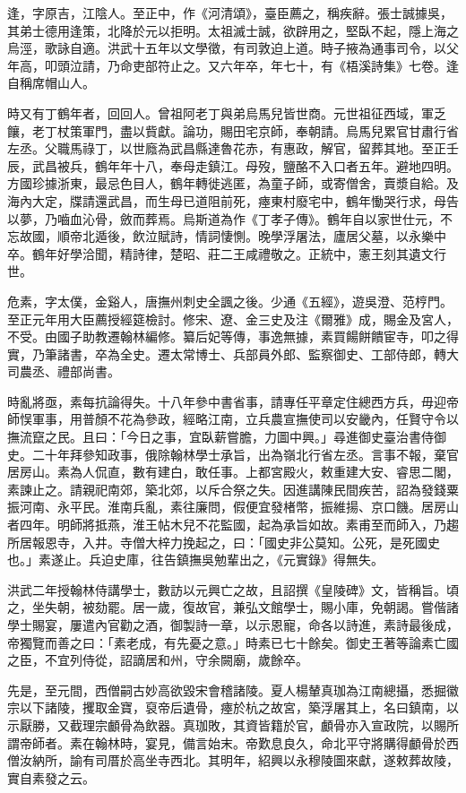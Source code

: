 \begin{pinyinscope}
逢，字原吉，江陰人。至正中，作《河清頌》，臺臣薦之，稱疾辭。張士誠據吳，其弟士德用逢策，北降於元以拒明。太祖滅士誠，欲辟用之，堅臥不起，隱上海之烏涇，歌詠自適。洪武十五年以文學徵，有司敦迫上道。時子掖為通事司令，以父年高，叩頭泣請，乃命吏部符止之。又六年卒，年七十，有《梧溪詩集》七卷。逢自稱席帽山人。

時又有丁鶴年者，回回人。曾祖阿老丁與弟烏馬兒皆世商。元世祖征西域，軍乏饟，老丁杖策軍門，盡以貲獻。論功，賜田宅京師，奉朝請。烏馬兒累官甘肅行省左丞。父職馬祿丁，以世廕為武昌縣達魯花赤，有惠政，解官，留葬其地。至正壬辰，武昌被兵，鶴年年十八，奉母走鎮江。母歿，鹽酪不入口者五年。避地四明。方國珍據浙東，最忌色目人，鶴年轉徙逃匿，為童子師，或寄僧舍，賣漿自給。及海內大定，牒請還武昌，而生母已道阻前死，瘞東村廢宅中，鶴年慟哭行求，母告以夢，乃嚙血沁骨，斂而葬焉。烏斯道為作《丁孝子傳》。鶴年自以家世仕元，不忘故國，順帝北遁後，飲泣賦詩，情詞悽惻。晚學浮屠法，廬居父墓，以永樂中卒。鶴年好學洽聞，精詩律，楚昭、莊二王咸禮敬之。正統中，憲王刻其遺文行世。

危素，字太僕，金谿人，唐撫州刺史全諷之後。少通《五經》，遊吳澄、范梈門。至正元年用大臣薦授經筵檢討。修宋、遼、金三史及注《爾雅》成，賜金及宮人，不受。由國子助教遷翰林編修。纂后妃等傳，事逸無據，素買餳餅饋宦寺，叩之得實，乃筆諸書，卒為全史。遷太常博士、兵部員外郎、監察御史、工部侍郎，轉大司農丞、禮部尚書。

時亂將亟，素每抗論得失。十八年參中書省事，請專任平章定住總西方兵，毋迎帝師悮軍事，用普顏不花為參政，經略江南，立兵農宣撫使司以安畿內，任賢守令以撫流竄之民。且曰：「今日之事，宜臥薪嘗膽，力圖中興。」尋進御史臺治書侍御史。二十年拜參知政事，俄除翰林學士承旨，出為嶺北行省左丞。言事不報，棄官居房山。素為人侃直，數有建白，敢任事。上都宮殿火，敕重建大安、睿思二閣，素諫止之。請親祀南郊，築北郊，以斥合祭之失。因進講陳民間疾苦，詔為發錢粟振河南、永平民。淮南兵亂，素往廉問，假便宜發楮幣，振維揚、京口饑。居房山者四年。明師將抵燕，淮王帖木兒不花監國，起為承旨如故。素甫至而師入，乃趨所居報恩寺，入井。寺僧大梓力挽起之，曰：「國史非公莫知。公死，是死國史也。」素遂止。兵迫史庫，往告鎮撫吳勉輩出之，《元實錄》得無失。

洪武二年授翰林侍講學士，數訪以元興亡之故，且詔撰《皇陵碑》文，皆稱旨。頃之，坐失朝，被劾罷。居一歲，復故官，兼弘文館學士，賜小庫，免朝謁。嘗偕諸學士賜宴，屢遣內官勸之酒，御製詩一章，以示恩寵，命各以詩進，素詩最後成，帝獨覽而善之曰：「素老成，有先憂之意。」時素已七十餘矣。御史王著等論素亡國之臣，不宜列侍從，詔謫居和州，守余闕廟，歲餘卒。

先是，至元間，西僧嗣古妙高欲毀宋會稽諸陵。夏人楊輦真珈為江南總攝，悉掘徽宗以下諸陵，攫取金寶，裒帝后遺骨，瘞於杭之故宮，築浮屠其上，名曰鎮南，以示厭勝，又截理宗顱骨為飲器。真珈敗，其資皆籍於官，顱骨亦入宣政院，以賜所謂帝師者。素在翰林時，宴見，備言始末。帝歎息良久，命北平守將購得顱骨於西僧汝納所，諭有司厝於高坐寺西北。其明年，紹興以永穆陵圖來獻，遂敕葬故陵，實自素發之云。


\end{pinyinscope}
